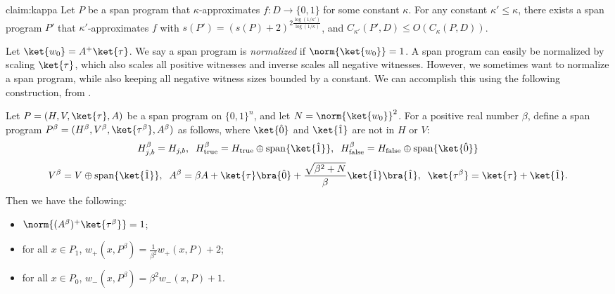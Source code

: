 \documentclass{toc}
\begin{document}
\begin{repclaim}{claim:kappa}
Let $P$ be a span program that $\kappa$-approximates $f:D\rightarrow\{0,1\}$ for some constant $\kappa$. For any constant $\kappa'\leq \kappa$, there exists a span program $P'$ that $\kappa'$-approximates $f$ with $s(P')=(s(P)+2)^{2\frac{\log(1/\kappa')}{\log(1/\kappa)}}$, and $C_{\kappa'}(P',D)\leq O\left(C_\kappa(P,D)\right)$. 
\end{repclaim}


Let $\ket{w_0}=A^+\ket{\tau}$. We say a span program is \emph{normalized} if $\norm{\ket{w_0}}=1$. A span program can easily be normalized by scaling $\ket{\tau}$, which also scales all positive witnesses and inverse scales all negative witnesses. However, we sometimes want to normalize a span program, while also keeping all negative witness sizes bounded by a constant. We can accomplish this using the following construction, from \cite{IJ15}. 

\begin{theorem}\label{thm:scaling}
Let $P=(H,V,\ket{\tau},A)$ be a span program on $\{0,1\}^n$, and let $N=\norm{\ket{w_0}}^2$. For a positive real number $\beta$, define a span program $P^{\beta}=(H^\beta,V^\beta,\ket{\tau^\beta},A^\beta)$ as follows, where $\ket{\hat{0}}$ and $\ket{\hat{1}}$ are not in $H$ or $V$:
$$H_{j,b}^\beta = H_{j,b}, \;\; H_{\mathrm{true}}^\beta=H_{\mathrm{true}}\oplus \mathrm{span}\{\ket{\hat{1}}\},
\;\; H_{\mathrm{false}}^\beta=H_{\mathrm{false}}\oplus \mathrm{span}\{\ket{\hat{0}}\}$$
$$V^\beta = V\oplus \mathrm{span}\{\ket{\hat{1}}\},\;\; A^\beta = \beta A + \ket{\tau}\bra{\hat{0}}+\frac{\sqrt{\beta^2+N}}{\beta}\ket{\hat{1}}\bra{\hat{1}}, \;\; \ket{\tau^\beta} = \ket{\tau}+\ket{\hat{1}}.$$
Then we have the following:
\begin{itemize}
\item $\norm{(A^\beta)^+\ket{\tau^\beta}}=1$;
\item for all $x\in P_1$, ${w}_+(x,P^\beta)=\frac{1}{\beta^2}w_+(x,P)+2$;
\item for all $x\in P_0$, $w_-(x,P^\beta)=\beta^2 w_-(x,P)+1$.
\end{itemize}
\end{theorem}
\end{document}
